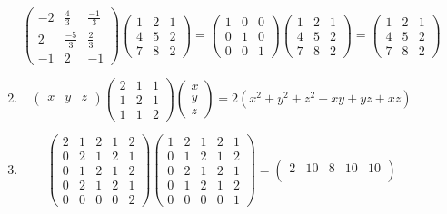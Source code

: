 \documentclass[letterpaper,10pt]{article}
\begin{document}
\begin{description}
\begin{enumerate}[label=\alph*.]
\[\begin{pmatrix}
-2 & \frac{4}{3} & \frac{-1}{3}\\
2 & \frac{-5}{3} & \frac{2}{3}\\
-1 & 2 &-1
\end{pmatrix}\begin{pmatrix}
1 & 2 & 1\\
4 & 5 & 2\\
7 & 8 & 2
\end{pmatrix}=\begin{pmatrix}
1 & 0 & 0\\
0 & 1 & 0\\
0 & 0 & 1
\end{pmatrix}\begin{pmatrix}
1 & 2 & 1\\
4 & 5 & 2\\
7 & 8 & 2
\end{pmatrix}=\begin{pmatrix}
1 & 2 & 1\\
4 & 5 & 2\\
7 & 8 & 2
\end{pmatrix}
\]
\item
\[\begin{pmatrix}
x & y & z
\end{pmatrix}\begin{pmatrix}
2 & 1 & 1\\
1 & 2 & 1\\
1 & 1 & 2
\end{pmatrix}\begin{pmatrix}
x\\
y\\
z
\end{pmatrix}=2(x^2+y^2+z^2+xy+yz+xz)
\]
\item
\[\begin{pmatrix}
2 & 1 & 2 & 1 & 2\\
0 & 2 & 1 & 2 & 1\\
0 & 1 & 2 & 1 & 2\\
0 & 2 & 1 & 2 & 1\\
0 & 0 & 0 & 0 & 2
\end{pmatrix}\begin{pmatrix}
1 & 2 & 1 & 2 & 1\\
0 & 1 & 2 & 1 & 2\\
0 & 2 & 1 & 2 & 1\\
0 & 1 & 2 & 1 & 2\\
0 & 0 & 0 & 0 & 1
\end{pmatrix}=\begin{pmatrix}
2 & 10 & 8 & 10 & 10\\

\end{pmatrix}\]
\end{enumerate}
\end{description}
\end{document}
